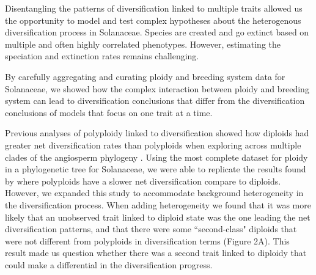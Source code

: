 Disentangling the patterns of diversification linked to  multiple traits allowed us the opportunity to model and test complex hypotheses about the heterogenous diversification process in Solanaceae.
Species are created and go extinct based on multiple and often highly correlated phenotypes. However, estimating the speciation and extinction rates remains challenging. 

By carefully aggregating and curating ploidy and breeding system data for Solanaceae, we showed how  the complex interaction between ploidy and breeding system  can lead to diversification conclusions that differ from the diversification conclusions of models that focus on one trait at a time.





Previous analyses of polyploidy linked to diversification showed how diploids had greater net diversification rates than polyploids when exploring across multiple clades of the angiosperm phylogeny \citet{mayrose_2011, mayrose_2015}. 
Using the most complete dataset for ploidy in a phylogenetic tree for Solanaceae, we were able to replicate the results found by \citet{mayrose_2011} where polyploids have a slower net diversification compare to diploids.
However, we expanded this study to accommodate  background heterogeneity in the diversification process.
When adding heterogeneity we found that it was more likely that an unobserved trait linked to diploid state was the one leading the net diversification patterns, and that there were some ``second-class"  diploids that were not different from  polyploids  in diversification terms (Figure 2A).
This result made us question whether there was a second trait linked to diploidy that could make a differential in the diversification progress.

